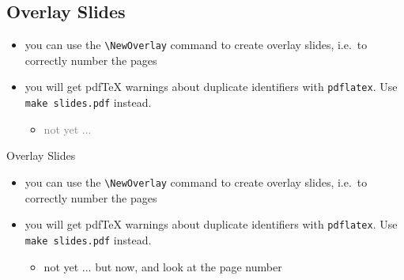 \documentclass[11pt,a4paper,landscape]{article}
\begin{document}
\NewPage\subsection{Overlay Slides}
\vfill
\begin{itemize}
\item you can use the \texttt{\textbackslash NewOverlay} command to create
  overlay slides, i.e.\ to correctly number the pages
\item you will get pdfTeX warnings about duplicate identifiers with
  \texttt{pdflatex}. Use \texttt{make slides.pdf} instead.
  \begin{itemize}
  \item \textcolor{gray}{not yet ...}  %
  \end{itemize}
\end{itemize}
\vfill

\NewOverlay\centerline{Overlay Slides}
\vfill
\begin{itemize}
\item you can use the \texttt{\textbackslash NewOverlay} command to create
  overlay slides, i.e.\ to correctly number the pages
\item you will get pdfTeX warnings about duplicate identifiers with
  \texttt{pdflatex}. Use \texttt{make slides.pdf} instead.
  \begin{itemize}
  \item not yet ... but now, and look at the page number
  \end{itemize}
\end{itemize}
\vfill

\end{document}
